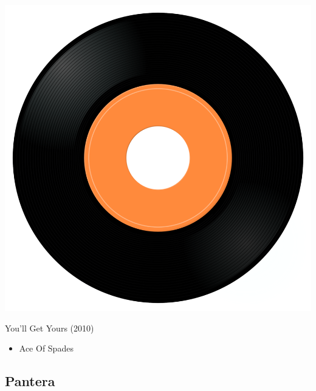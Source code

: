 \begin{minipage}[t]{0.25\textwidth}
\captionsetup{type=figure}
\includegraphics[width=\textwidth]{Images/cover.png}
\caption*{You'll Get Yours (2010)}
\end{minipage}
\begin{minipage}[t]{0.25\textwidth}\vspace{0pt}
\begin{itemize}[nosep,leftmargin=1em,labelwidth=*,align=left]
	\setlength{\itemsep}{0pt}
	\item Ace Of Spades
\end{itemize}
\end{minipage}

\subsection{Pantera}

